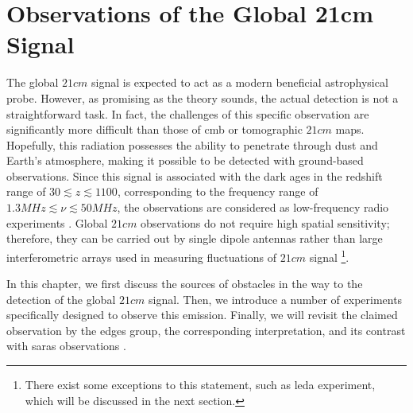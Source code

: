 \documentclass[12pt, TexShade, letterpaper]{report}
\begin{document}
\chapter{Observations of the Global 21cm Signal}
\label{chap:observations}
The global $21cm$ signal is expected to act as a modern beneficial astrophysical probe. However, as promising as the theory sounds, the actual detection is not a straightforward task. In fact, the challenges of this specific observation are significantly more difficult than those of \gls{cmb} or tomographic $21cm$ maps. 
Hopefully, this radiation possesses the ability to penetrate through dust and Earth's atmosphere, making it possible to be detected with ground-based observations. Since this signal is associated with the dark ages in the redshift range of $30 \lesssim z \lesssim 1100$, corresponding to the frequency range of $1.3 MHz\lesssim \nu \lesssim 50 MHz$, the observations are considered as low-frequency radio experiments \cite{thesis_pamela, thesis_moso}.
Global $21cm$ observations do not require high spatial sensitivity; therefore, they can be carried out by single dipole antennas rather than large interferometric arrays used in measuring fluctuations of $21cm$ signal \footnote{There exist some exceptions to this statement, such as \gls{leda} experiment, which will be discussed in the next section.}\cite{thesis_shedding}.\par
In this chapter, we first discuss the sources of obstacles in the way to the detection of the global $21cm$ signal. Then, we introduce a number of experiments specifically designed to observe this emission. Finally, we will revisit the claimed observation by the \gls{edges} group, the corresponding interpretation, and its contrast with \gls{saras} observations \cite{saras_curse_edges}.
\end{document}
